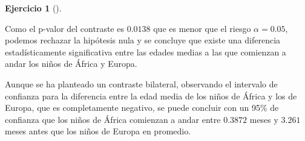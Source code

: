 \documentclass[
  a4paper,
]{scrreport}
\theoremstyle{definition}
\newtheorem{exercise}{Ejercicio}[chapter]
\theoremstyle{remark}
\begin{document}
\begin{exercise}[]
\begin{enumerate}
\begin{tcolorbox}
  Como el p-valor del contraste es \(0.0138\) que es menor que el riesgo
  \(\alpha=0.05\), podemos rechazar la hipótesis nula y se concluye que
  existe una diferencia estadísticamente significativa entre las edades
  medias a las que comienzan a andar los niños de África y Europa.

  Aunque se ha planteado un contraste bilateral, observando el intervalo
  de confianza para la diferencia entre la edad media de los niños de
  África y los de Europa, que es completamente negativo, se puede
  concluir con un 95\% de confianza que los niños de África comienzan a
  andar entre \(0.3872\) meses y \(3.261\) meses antes que los niños de
  Europa en promedio.

  \end{tcolorbox}
\end{enumerate}

\end{exercise}
\end{document}
